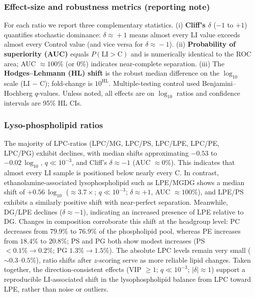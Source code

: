 \documentclass[10pt,letterpaper]{article}
\begin{document}
\begin{itemize}
\subsubsection*{Effect-size and robustness metrics (reporting note)}
For each ratio we report three complementary statistics. 
(i) \textbf{Cliff's $\delta$} ($-1$ to $+1$) quantifies stochastic dominance: $\delta\!\approx\!+1$ means almost every LI value exceeds almost every Control value (and vice versa for $\delta\!\approx\!-1$). 
(ii) \textbf{Probability of superiority (AUC)} equals $P(\text{LI}>\text{C})$ and is numerically identical to the ROC area; AUC $\approx 100\%$ (or $0\%$) indicates near-complete separation. 
(iii) The \textbf{Hodges–Lehmann (HL) shift} is the robust median difference on the $\log_{10}$ scale (LI $-$ C); fold-change is $10^{\text{HL}}$. 
Multiple-testing control used Benjamini–Hochberg $q$-values.
Unless noted, all effects are on $\log_{10}$ ratios and confidence intervals are 95\% HL CIs.


\subsubsection*{Lyso-phospholipid ratios}
The majority of LPC-ratios (LPC/MG, LPC/PS, LPC/LPE, LPC/PE, LPC/PG) exhibit declines, with median shifts approximating $-0.53$ to $-0.02 \,\log_{10}$, $q \ll 10^{-3}$, and Cliff’s $\delta \approx -1$ (AUC $\approx 0\%$). This indicates that almost every LI sample is positioned below nearly every C. In contrast, ethanolamine-associated lysophospholipid such as LPE/MGDG shows a median shift of  $+0.56 \,\log_{10}$ ($\approx 3.7\times$; $q \ll 10^{-3}$; $\delta \approx +1$, AUC $\approx 100\%$), and LPE/PS exhibits a similarly positive shift with near-perfect separation. Meanwhile, DG/LPE declines ($\delta \approx -1$), indicating an increased presence of LPE relative to DG. Changes in composition corroborate this shift at the headgroup level: PC decreases from $79.9\%$ to $76.9\%$ of the phospholipid pool, whereas PE increases from $18.4\%$ to $20.8\%$; PS and PG both show modest increases (PS $<0.1\% \rightarrow 0.2\%$; PG $1.3\% \rightarrow 1.5\%$). The absolute LPC levels remain very small ($\sim 0.3$–$0.5\%$), ratio shifts after $z$-scoring serve as more reliable lipid changes. Taken together, the direction-consistent effects (VIP $\geq 1$; $q \ll 10^{-3}$; $|\delta| \approx 1$) support a reproducible LI-associated shift in the lysophospholipid balance from LPC toward LPE, rather than noise or outliers.



\end{itemize}
\end{document}
